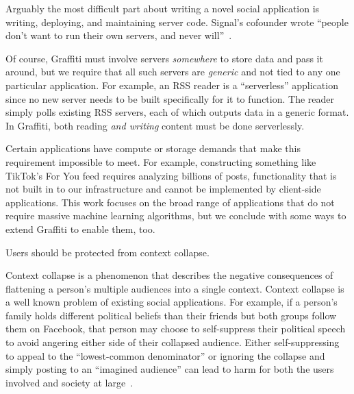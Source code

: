 Arguably the most difficult part about writing a novel
social application is writing, deploying,
and maintaining server code.
Signal's cofounder wrote
``people don’t want to run their own servers, and never will''~\cite{moxieweb3}.

Of course, Graffiti must involve servers \emph{somewhere} to store data
and pass it around, but we require that all such servers are \emph{generic}
and not tied to any one particular application.
For example, an RSS reader is a ``serverless'' application since
no new server needs to be built specifically for it to function.
The reader simply polls existing RSS servers, each of which outputs data in a generic format.
In Graffiti, both reading \emph{and writing} content must be done serverlessly.

Certain applications have compute or storage demands that make this requirement impossible to meet.
For example, constructing something like TikTok's For You feed requires
analyzing billions of posts, functionality that is not built in to our infrastructure and cannot be implemented by client-side applications.
This work focuses on the broad range of applications
that do not require massive machine learning algorithms,
but we conclude with some ways to extend Graffiti to enable them, too.


\begin{requirement}
\label{requirements:context-differentiation}
    Users should be protected from context collapse.
\end{requirement}

Context collapse is a phenomenon that describes the negative consequences of flattening
a person's multiple audiences into a single context.
Context collapse is a well known problem of existing social applications.
For example, if a person's family holds different political beliefs than their friends
but both groups follow them on Facebook, that person may choose to self-suppress their political
speech to avoid angering either side of their collapsed audience.
Either self-suppressing to appeal to the ``lowest-common denominator'' or ignoring the collapse
and simply posting to an ``imagined audience'' can lead to harm for both
the users involved and society at large~\cite{contextcollapse, contextcollapseimpact, contextcollapsequeer, spiralofsilencesocialmedia}.


